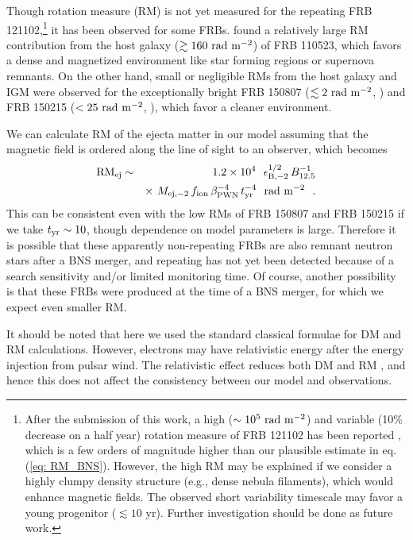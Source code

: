 \documentclass[]{pasj01}
\begin{document}
Though rotation measure (RM) is not yet measured for the repeating FRB
121102,\footnote{After the submission of this work, a
    high ($\sim10^5 \ \rm rad \ m^{-2}$) and variable (10\% decrease
    on a half year) rotation measure of FRB 121102 has been reported
    \citep{Michilli2018}, which is a few orders of magnitude higher
    than our plausible estimate in eq. (\ref{eq: RM_BNS}). However, the high RM may be
    explained if we consider a highly clumpy density structure (e.g.,
    dense nebula filaments), which would enhance magnetic fields. The
    observed short variability timescale may favor a young progenitor
    ($\lesssim10$ yr). Further investigation should be done as future
    work. } it has been observed for some FRBs. \citet{Masui2015}
found a relatively large RM contribution from the host galaxy
($\gtrsim 160 \ \rm rad \ m^{-2}$) of FRB 110523, which favors a dense
and magnetized environment like star forming regions or supernova
remnants. On the other hand, small or negligible RMs from the host
galaxy and IGM were observed for the exceptionally bright FRB 150807
($\lesssim 2 \ \rm rad \ m^{-2}$, \cite{Ravi2016}) and FRB 150215 ($<
25 \ \rm rad \ m^{-2}$, \cite{Petroff2017}), which favor a cleaner
environment.

We can calculate RM of the ejecta matter in our model assuming that
the magnetic field is ordered along the line of sight to an observer,
which becomes
\begin{eqnarray}
\label{eq: RM_BNS}
{\rm RM_{\rm ej}} &\sim& 1.2 \times 10^4 \ 
\ \epsilon_{{\rm B},-2}^{1/2}\,B_{12.5}^{-1} \nonumber  \\ 
&& \times \ M_{{\rm ej},-2}\,f_{\rm
  ion}\, \beta_{\rm PWN}^{-4}\,t_{\rm yr}^{-4} \ \ 
{\rm rad \ m^{-2}}\ \ .
\end{eqnarray}
This can be consistent even with the low RMs of FRB 150807 and FRB
150215 if we take $t_{\rm yr} \sim 10$, though dependence on model
parameters is large. Therefore it is possible that these apparently
non-repeating FRBs are also remnant neutron stars after a BNS
merger, and repeating has not yet been detected because of a search
sensitivity and/or limited monitoring time.  Of course, another
possibility is that these FRBs were produced at the time of a BNS
merger, for which we expect even smaller RM.

It should be noted that here we used the standard classical formulae
for DM and RM calculations. However, electrons may have relativistic
energy after the energy injection from pulsar wind.  The relativistic
effect reduces both DM and RM \citep{Shcherbakov2008}, and hence this
does not affect the consistency between our model and observations.
\end{document}
